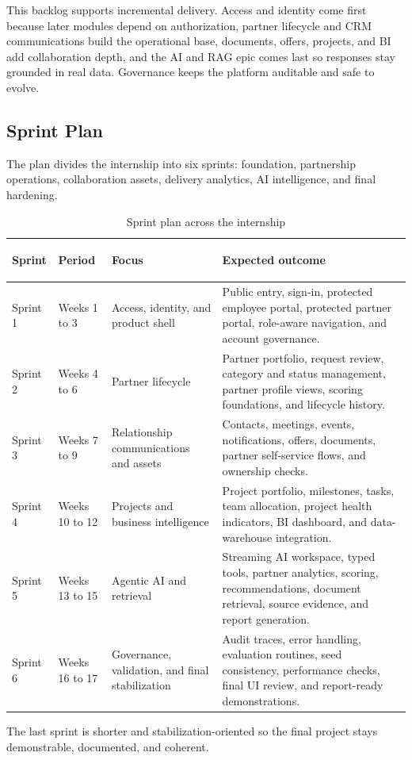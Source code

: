 This backlog supports incremental delivery. Access and identity come first because later modules depend on authorization, partner lifecycle and CRM communications build the operational base, documents, offers, projects, and BI add collaboration depth, and the AI and RAG epic comes last so responses stay grounded in real data. Governance keeps the platform auditable and safe to evolve.
\subsection{Sprint Plan}
The plan divides the internship into six sprints: foundation, partnership operations, collaboration assets, delivery analytics, AI intelligence, and final hardening.

\begin{table}[H]
  \centering
  \caption{Sprint plan across the internship}
  \begin{tabularx}{\textwidth}{>{\bfseries\raggedright\arraybackslash}p{1.5cm}>{\raggedright\arraybackslash}p{2.4cm}>{\raggedright\arraybackslash}p{3.3cm}X}
    \toprule
    Sprint & Period & Focus & Expected outcome \\
    \midrule
    Sprint 1 & Weeks 1 to 3 & Access, identity, and product shell & Public entry, sign-in, protected employee portal, protected partner portal, role-aware navigation, and account governance. \\
    Sprint 2 & Weeks 4 to 6 & Partner lifecycle & Partner portfolio, request review, category and status management, partner profile views, scoring foundations, and lifecycle history. \\
    Sprint 3 & Weeks 7 to 9 & Relationship communications and assets & Contacts, meetings, events, notifications, offers, documents, partner self-service flows, and ownership checks. \\
    Sprint 4 & Weeks 10 to 12 & Projects and business intelligence & Project portfolio, milestones, tasks, team allocation, project health indicators, BI dashboard, and data-warehouse integration. \\
    Sprint 5 & Weeks 13 to 15 & Agentic AI and retrieval & Streaming AI workspace, typed tools, partner analytics, scoring, recommendations, document retrieval, source evidence, and report generation. \\
    Sprint 6 & Weeks 16 to 17 & Governance, validation, and final stabilization & Audit traces, error handling, evaluation routines, seed consistency, performance checks, final UI review, and report-ready demonstrations. \\
    \bottomrule
  \end{tabularx}
\end{table}
The last sprint is shorter and stabilization-oriented so the final project stays demonstrable, documented, and coherent.
